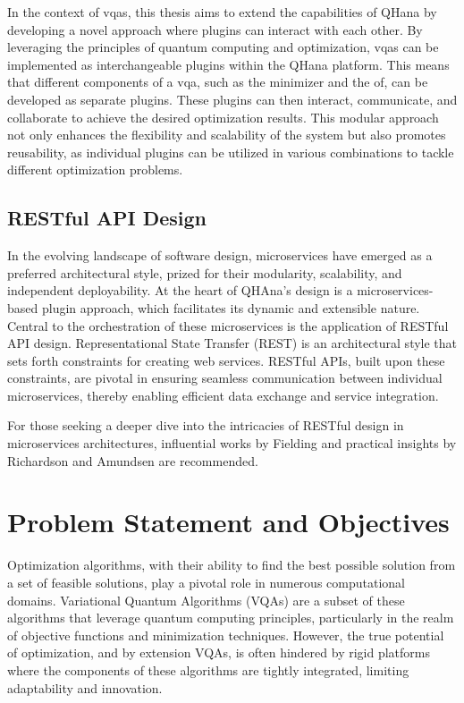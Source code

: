 \documentclass[
  a4paper,  %
  twoside,  %
  bibliography=totoc,
  headsepline,
  cleardoublepage=empty,
  parskip=half,
  draft=false
]{scrbook}
\begin{document}
In the context of \glspl{vqa}, this thesis aims to extend the capabilities of QHana by developing a novel approach where plugins can interact with each other.
By leveraging the principles of quantum computing and optimization, \glspl{vqa} can be implemented as interchangeable plugins within the QHana platform.
This means that different components of a \gls{vqa}, such as the minimizer and the \gls{of}, can be developed as separate plugins.
These plugins can then interact, communicate, and collaborate to achieve the desired optimization results.
This modular approach not only enhances the flexibility and scalability of the system but also promotes reusability, as individual plugins can be utilized in various combinations to tackle different optimization problems.


\section{RESTful API Design}
In the evolving landscape of software design, microservices have emerged as a preferred architectural style, prized for their modularity, scalability, and independent deployability.
At the heart of QHAna's design is a microservices-based plugin approach, which facilitates its dynamic and extensible nature.
Central to the orchestration of these microservices is the application of RESTful API design.
Representational State Transfer (REST) is an architectural style that sets forth constraints for creating web services.
RESTful APIs, built upon these constraints, are pivotal in ensuring seamless communication between individual microservices, thereby enabling efficient data exchange and service integration.

For those seeking a deeper dive into the intricacies of RESTful design in microservices architectures, influential works by Fielding \cite{Fielding2000} and practical insights by Richardson and Amundsen \cite{Richardson2013} are recommended.

\chapter{Problem Statement and Objectives}
\label{chap:problem}

Optimization algorithms, with their ability to find the best possible solution from a set of feasible solutions, play a pivotal role in numerous computational domains.
Variational Quantum Algorithms (VQAs) are a subset of these algorithms that leverage quantum computing principles, particularly in the realm of objective functions and minimization techniques.
However, the true potential of optimization, and by extension VQAs, is often hindered by rigid platforms where the components of these algorithms are tightly integrated, limiting adaptability and innovation.
\end{document}
